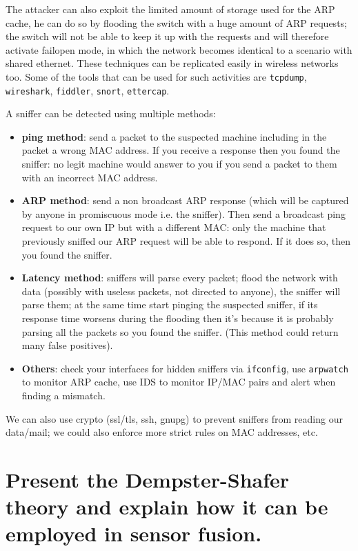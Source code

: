 \documentclass[a4paper, 12pt]{article}
\begin{document}
The attacker can also exploit the limited amount of storage used for the ARP cache, he can do so by flooding the switch with a huge amount of ARP requests; the switch will not be able to keep it up with the requests and will therefore activate failopen mode, in which the network becomes identical to a scenario with shared ethernet. These techniques can be replicated easily in wireless networks too. Some of the tools that can be used for such activities are \texttt{tcpdump}, \texttt{wireshark}, \texttt{fiddler}, \texttt{snort}, \texttt{ettercap}.

A sniffer can be detected using multiple methods:

\begin{itemize}
    \item \textbf{ping method}: send a packet to the suspected machine including in the packet a wrong MAC address. If you receive a response then you found the sniffer: no legit machine would answer to you if you send a packet to them with an incorrect MAC address.
    \item \textbf{ARP method}: send a non broadcast ARP response (which will be captured by anyone in promiscuous mode i.e. the sniffer). Then send a broadcast ping request to our own IP but with a different MAC: only the machine that previously sniffed our ARP request will be able to respond. If it does so, then you found the sniffer.
    \item \textbf{Latency method}: sniffers will parse every packet; flood the network with data (possibly with useless packets, not directed to anyone), the sniffer will parse them; at the same time start pinging the suspected sniffer, if its response time worsens during the flooding then it's because it is probably parsing all the packets so you found the sniffer. (This method could return many false positives).
    \item \textbf{Others}: check your interfaces for hidden sniffers via \texttt{ifconfig}, use \texttt{arpwatch} to monitor ARP cache, use IDS to monitor IP/MAC pairs and alert when finding a mismatch.
\end{itemize}

We can also use crypto (ssl/tls, ssh, gnupg) to prevent sniffers from reading our data/mail; we could also enforce more strict rules on MAC addresses, etc.

\section{Present the Dempster-Shafer theory and explain how it can be employed in sensor fusion.}
\end{document}
